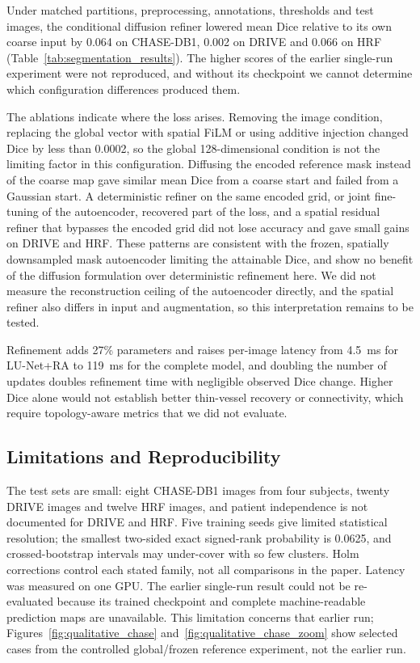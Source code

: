 \documentclass[jimaging,article,submit,pdftex,moreauthors]
  {Definitions/mdpi}
\newcommand{\revbegin}{\begingroup\color{blue}}
\newcommand{\revbegin}{\begingroup}
\newcommand{\revend}{\ifhmode\par\fi\endgroup}
\providecommand{\linelabel}[1]{}
\newcommand{\seclabel}[1]{\linelabel{rev:sec:#1}}
\newcommand{\secend}[1]{\linelabel{rev:end:#1}}
\begin{document}
\revbegin{}Under matched partitions, preprocessing, annotations, thresholds and test images, the conditional diffusion refiner lowered mean Dice relative to its own coarse input by 0.064 on CHASE-DB1, 0.002 on DRIVE and 0.066 on HRF (Table~\ref{tab:segmentation_results}). The higher scores of the earlier single-run experiment were not reproduced, and without its checkpoint we cannot determine which configuration differences produced them.

The ablations indicate where the loss arises. Removing the image condition, replacing the global vector with spatial FiLM or using additive injection changed Dice by less than 0.0002, so the global 128-dimensional condition is not the limiting factor in this configuration. Diffusing the encoded reference mask instead of the coarse map gave similar mean Dice from a coarse start and failed from a Gaussian start. A deterministic refiner on the same encoded grid, or joint fine-tuning of the autoencoder, recovered part of the loss, and a spatial residual refiner that bypasses the encoded grid did not lose accuracy and gave small gains on DRIVE and HRF. These patterns are consistent with the frozen, spatially downsampled mask autoencoder limiting the attainable Dice, and show no benefit of the diffusion formulation over deterministic refinement here. We did not measure the reconstruction ceiling of the autoencoder directly, and the spatial refiner also differs in input and augmentation, so this interpretation remains to be tested.

Refinement adds 27\% parameters and raises per-image latency from 4.5~ms for LU-Net+RA to 119~ms for the complete model, and doubling the number of updates doubles refinement time with negligible observed Dice change. Higher Dice alone would not establish better thin-vessel recovery or connectivity, which require topology-aware metrics that we did not evaluate.\secend{discussion}\revend{}

\subsection{Limitations and Reproducibility}
\label{sec:limitations}
\seclabel{limitations}

\revbegin{}The test sets are small: eight CHASE-DB1 images from four subjects, twenty DRIVE images and twelve HRF images, and patient independence is not documented for DRIVE and HRF. Five training seeds give limited statistical resolution; the smallest two-sided exact signed-rank probability is 0.0625, and crossed-bootstrap intervals may under-cover with so few clusters. Holm corrections control each stated family, not all comparisons in the paper. Latency was measured on one GPU. The earlier single-run result could not be re-evaluated because its trained checkpoint and complete machine-readable prediction maps are unavailable. This limitation concerns that earlier run; Figures~\ref{fig:qualitative_chase} and~\ref{fig:qualitative_chase_zoom} show selected cases from the controlled global/frozen reference experiment, not the earlier run.\revend{}
\end{document}
